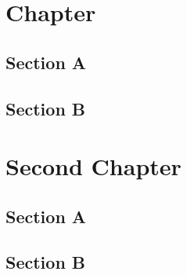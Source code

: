 \documentclass[12pt,a4paper]{book}
\begin{document}
\frontmatter
\dominitoc
\tableofcontents
{}
\renewcommand{\cftsecfont}{\normalfont\small}
\mainmatter
\chapter{Chapter}
\section{Section A}
\section{Section B}
\chapter{Second Chapter}
\minitoc
\section{Section A}
\section{Section B}
\end{document}
